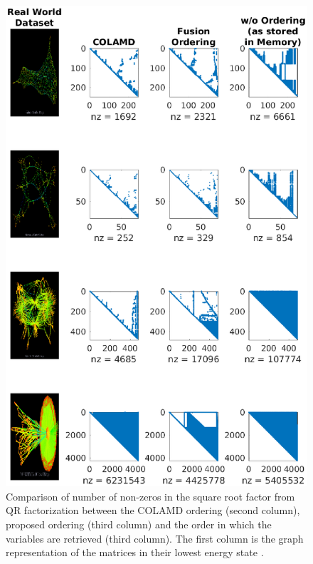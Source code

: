 \begin{figure}[!]
\includegraphics[width=\textwidth]{Chapters/figures3/ordering_comparison_2}
\caption{Comparison of number of non-zeros in the square root factor from QR factorization between the COLAMD ordering (second column), proposed ordering (third column) and the order in which the variables are retrieved (third column). The first column is the graph representation of the matrices in their lowest energy state \cite{suitesparse}.}
\label{fig:ordering_comparison_2}
\end{figure}
